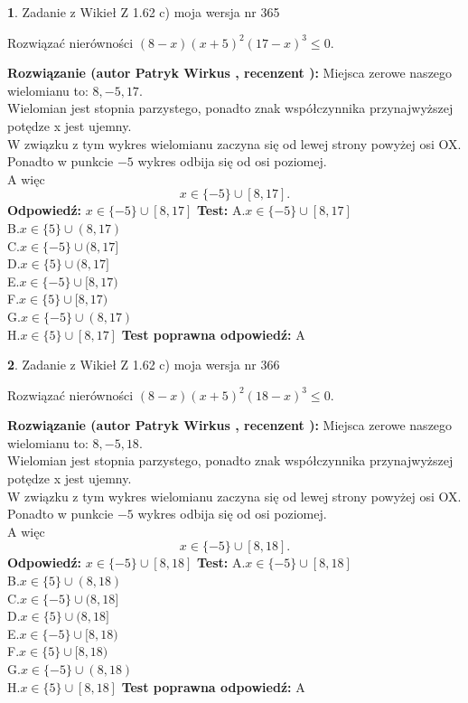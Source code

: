 \documentclass[12pt, a4paper]{article}
\theoremstyle{definition} %
\newtheorem{zad}{}
\newcommand{\zadStart}[1]{\begin{zad}#1\newline}
\newcommand{\zadStop}{\end{zad}}
\newcommand{\rozwStart}[2]{\noindent \textbf{Rozwiązanie (autor #1 , recenzent #2): }\newline}
\newcommand{\rozwStop}{\newline}
\newcommand{\odpStart}{\noindent \textbf{Odpowiedź:}\newline}
\newcommand{\odpStop}{\newline}
\newcommand{\testStart}{\noindent \textbf{Test:}\newline}
\newcommand{\testStop}{\newline}
\newcommand{\kluczStart}{\noindent \textbf{Test poprawna odpowiedź:}\newline}
\newcommand{\kluczStop}{\newline}
\begin{document}
\zadStart{Zadanie z Wikieł Z 1.62 c) moja wersja nr 365}

Rozwiązać nierówności $(8-x)(x+5)^{2}(17-x)^{3}\le0$.
\zadStop
\rozwStart{Patryk Wirkus}{}
Miejsca zerowe naszego wielomianu to: $8, -5, 17$.\\
Wielomian jest stopnia parzystego, ponadto znak współczynnika przy\linebreak najwyższej potędze x jest ujemny.\\ W związku z tym wykres wielomianu zaczyna się od lewej strony powyżej osi OX.\\
Ponadto w punkcie $-5$ wykres odbija się od osi poziomej.\\
A więc $$x \in \{-5\} \cup [8,17].$$
\rozwStop
\odpStart
$x \in \{-5\} \cup [8,17]$
\odpStop
\testStart
A.$x \in \{-5\} \cup [8,17]$\\
B.$x \in \{5\} \cup (8,17)$\\
C.$x \in \{-5\} \cup (8,17]$\\
D.$x \in \{5\} \cup (8,17]$\\
E.$x \in \{-5\} \cup [8,17)$\\
F.$x \in \{5\} \cup [8,17)$\\
G.$x \in \{-5\} \cup (8,17)$\\
H.$x \in \{5\} \cup [8,17]$
\testStop
\kluczStart
A
\kluczStop



\zadStart{Zadanie z Wikieł Z 1.62 c) moja wersja nr 366}

Rozwiązać nierówności $(8-x)(x+5)^{2}(18-x)^{3}\le0$.
\zadStop
\rozwStart{Patryk Wirkus}{}
Miejsca zerowe naszego wielomianu to: $8, -5, 18$.\\
Wielomian jest stopnia parzystego, ponadto znak współczynnika przy\linebreak najwyższej potędze x jest ujemny.\\ W związku z tym wykres wielomianu zaczyna się od lewej strony powyżej osi OX.\\
Ponadto w punkcie $-5$ wykres odbija się od osi poziomej.\\
A więc $$x \in \{-5\} \cup [8,18].$$
\rozwStop
\odpStart
$x \in \{-5\} \cup [8,18]$
\odpStop
\testStart
A.$x \in \{-5\} \cup [8,18]$\\
B.$x \in \{5\} \cup (8,18)$\\
C.$x \in \{-5\} \cup (8,18]$\\
D.$x \in \{5\} \cup (8,18]$\\
E.$x \in \{-5\} \cup [8,18)$\\
F.$x \in \{5\} \cup [8,18)$\\
G.$x \in \{-5\} \cup (8,18)$\\
H.$x \in \{5\} \cup [8,18]$
\testStop
\kluczStart
A
\kluczStop
\end{document}

